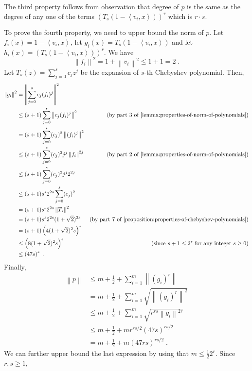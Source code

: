 \documentclass[12pt]{article}
\newcommand{\ip}[2]{\left\langle #1, #2 \right\rangle} %
\newcommand{\norm}[1]{\left\| #1 \right\|}  %
\begin{document}
The third property follows from observation that degree of $p$
is the same as the degree of any one of the terms
$\left( T_s(1 - \ip{v_i}{x}) \right)^r$ which is $r \cdot s$.

To prove the fourth property, we need to upper bound the norm of $p$.
Let $f_i(x) = 1 - \ip{v_i}{x}$, let $g_i(x) = T_s(1 - \ip{v_i}{x})$
and let $h_i(x) = (T_s(1 - \ip{v_i}{x}))^r$. We have
$$
\norm{f_i}^2 = 1 + \norm{v_i}^2 \le 1 + 1 = 2 \; .
$$
Let $T_s(z) = \sum_{j=0}^s c_j z^j$ be the expansion of $s$-th Chebyshev polynomial.
Then,
\begingroup
\allowdisplaybreaks
\begin{align*}
\norm{g_i}^2
& = \norm{ \sum_{j=0}^s c_j (f_i)^j }^2 \\
& \le (s + 1) \sum_{j=0}^s \norm{c_j (f_i)^j}^2 & \text{(by~part 3 of \autoref{lemma:properties-of-norm-of-polynomials})} \\
& = (s + 1) \sum_{j=0}^s (c_j)^2 \norm{(f_i)^j}^2 \\
& \le (s + 1) \sum_{j=0}^s (c_j)^2 j^j \norm{f_i}^{2j} & \text{(by~part 2 of \autoref{lemma:properties-of-norm-of-polynomials})} \\
& \le (s + 1) \sum_{j=0}^s (c_j)^2 j^j 2^{2j} \\
& \le (s + 1) s^s 2^{2s} \sum_{j=0}^s (c_j)^2 \\
& = (s + 1) s^s 2^{2s} \norm{T_s}^2 \\
& = (s + 1) s^s 2^{2s} (1 + \sqrt{2})^{2s} & \text{(by~part 7 of \autoref{proposition:properties-of-chebyshev-polynomials})} \\
& = (s + 1) \left(4(1+\sqrt{2})^2 s \right)^s \\
& \le \left(8(1+\sqrt{2})^2 s \right)^s & \text{(since $s+1 \le 2^s$ for any integer $s \ge 0$)} \\
& \le \left(47 s \right)^s \; .
\end{align*}
\endgroup
Finally,
\begin{align*}
\norm{p}
& \le m + \frac{1}{2} + \sum_{i=1}^m \norm{(g_i)^r} \\
& = m + \frac{1}{2} + \sum_{i=1}^m \sqrt{\norm{(g_i)^r}^2} \\
& \le m + \frac{1}{2} + \sum_{i=1}^m \sqrt{r^{rs} \norm{g_i}^{2r}} \\
& \le m + \frac{1}{2} + m r^{rs/2} \left(47 s \right)^{rs/2} \\
& = m + \frac{1}{2} + m \left(47 rs \right)^{rs/2} \; .
\end{align*}
We can further upper bound the last expression by using that $m \le \frac{1}{2} 2^r$.
Since $r,s \ge 1$,
\end{document}
